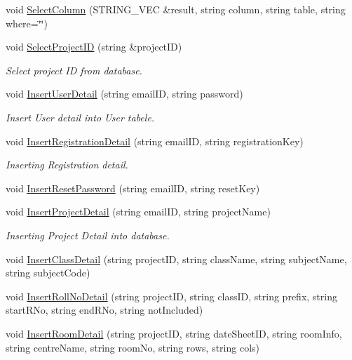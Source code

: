 \begin{DoxyCompactItemize}
\item 
void \hyperlink{classDatabase_a52049c686ad213533bdb1c4f2ac3c157}{\-Select\-Column} (\-S\-T\-R\-I\-N\-G\-\_\-\-V\-E\-C \&result, string column, string table, string where=\char`\"{}\char`\"{})
\item 
void \hyperlink{classDatabase_a20f7ccadac8f3b67d4344f7da4594eda}{\-Select\-Project\-I\-D} (string \&project\-I\-D)
\begin{DoxyCompactList}\small\item\em \-Select project \-I\-D from database. \end{DoxyCompactList}\item 
void \hyperlink{classDatabase_ac2a20fd57ba7a51f819446e799d7100f}{\-Insert\-User\-Detail} (string email\-I\-D, string password)
\begin{DoxyCompactList}\small\item\em \-Insert \-User detail into \-User tabele. \end{DoxyCompactList}\item 
void \hyperlink{classDatabase_a0da52e0b3d6e36d0833da38a01e592ea}{\-Insert\-Registration\-Detail} (string email\-I\-D, string registration\-Key)
\begin{DoxyCompactList}\small\item\em \-Inserting \-Registration detail. \end{DoxyCompactList}\item 
void \hyperlink{classDatabase_a1ff67f74b3c9c7893880cfefda1dc692}{\-Insert\-Reset\-Password} (string email\-I\-D, string reset\-Key)
\item 
void \hyperlink{classDatabase_a12b1d8ae6998720ad1842382ef5aa6cc}{\-Insert\-Project\-Detail} (string email\-I\-D, string project\-Name)
\begin{DoxyCompactList}\small\item\em \-Inserting \-Project \-Detail into database. \end{DoxyCompactList}\item 
void \hyperlink{classDatabase_ad0052cd5a48f5ba3233395096ba6e422}{\-Insert\-Class\-Detail} (string project\-I\-D, string class\-Name, string subject\-Name, string subject\-Code)
\item 
void \hyperlink{classDatabase_a91882082bd5309ba21d7250f0877ab39}{\-Insert\-Roll\-No\-Detail} (string project\-I\-D, string class\-I\-D, string prefix, string start\-R\-No, string end\-R\-No, string not\-Included)
\item 
void \hyperlink{classDatabase_a27092ca18e5f95b2808e54ad89c6ca35}{\-Insert\-Room\-Detail} (string project\-I\-D, string date\-Sheet\-I\-D, string room\-Info, string centre\-Name, string room\-No, string rows, string cols)

\end{DoxyCompactItemize}

